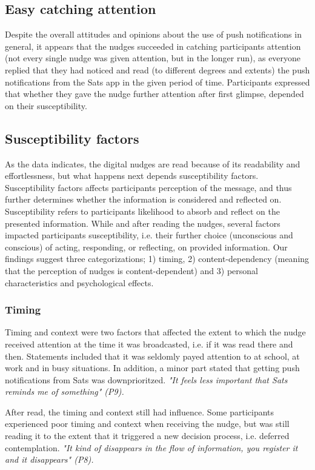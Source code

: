\subsection{Easy catching attention}
Despite the overall attitudes and opinions about the use of push notifications in general, it appears that the nudges succeeded in catching participants attention (not every single nudge was given attention, but in the longer run), as everyone replied that they had noticed and read (to different degrees and extents) the push notifications from the Sats app in the given period of time. Participants expressed that whether they gave the nudge further attention after first glimpse, depended on their susceptibility. 

\subsection{Susceptibility factors}
As the data indicates, the digital nudges are read because of its readability and effortlessness, but what happens next depends susceptibility factors. Susceptibility factors affects participants perception of the message, and thus further determines whether the information is considered and reflected on. Susceptibility refers to participants likelihood to absorb and reflect on the presented information. While and after reading the nudges, several factors impacted participants susceptibility, i.e. their further choice (unconscious and conscious) of acting, responding, or reflecting, on provided information. Our findings suggest three categorizations; 1) timing, 2) content-dependency (meaning that the perception of nudges is content-dependent) and 3) personal characteristics and psychological effects. 

\subsubsection{Timing}
 Timing and context were two factors that affected the extent to which the nudge received attention at the time it was broadcasted, i.e. if it was read there and then. Statements included that it was seldomly payed attention to at school, at work and in busy situations. In addition, a minor part stated that getting push notifications from Sats was downprioritzed.\textit{ "It feels less important that Sats reminds me of something" (P9). }

After read, the timing and context still had influence. Some participants experienced poor timing and context when receiving the nudge, but was still reading it to the extent that it triggered a new decision process, i.e. deferred contemplation. \textit{"It kind of disappears in the flow of information, you register it and it disappears" (P8).}

